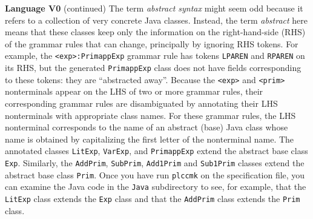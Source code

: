 \begin{minipage}[t]{\sw}
\slidenumber
\LARGE
{\bf Language V0} (continued)\exx
The term {\em abstract syntax} might seem odd
because it refers to a collection of very concrete Java classes.
Instead, the term {\em abstract} here means that
these classes keep only the information on the right-hand-side (RHS)
of the grammar rules that can change,
principally by ignoring RHS tokens.
For example, the \verb'<exp>:PrimappExp' grammar rule
has tokens \verb'LPAREN' and \verb'RPAREN' on its RHS,
but the generated \verb'PrimappExp' class
does not have fields corresponding to these tokens:
they are ``abstracted away''.\exx
Because the \verb'<exp>' and \verb'<prim>' nonterminals
appear on the LHS of two or more grammar rules,
their corresponding grammar rules are disambiguated
by annotating their LHS nonterminals with appropriate class names.
For these grammar rules, the LHS nonterminal corresponds to
the name of an abstract (base) Java class
whose name is obtained by capitalizing the first letter
of the nonterminal name.
The annotated classes \verb'LitExp', \verb'VarExp', and \verb'PrimappExp'
extend the abstract base class \verb'Exp'.
Similarly, the \verb'AddPrim', \verb'SubPrim',
\verb'Add1Prim' and \verb'Sub1Prim'
classes extend the abstract base class \verb'Prim'.\exx
Once you have run \verb'plccmk' on the specification file,
you can examine the Java code in the \verb'Java' subdirectory
to see, for example,
that the \verb'LitExp' class extends the \verb'Exp' class
and that the \verb'AddPrim' class extends the \verb'Prim' class.
\end{minipage}
